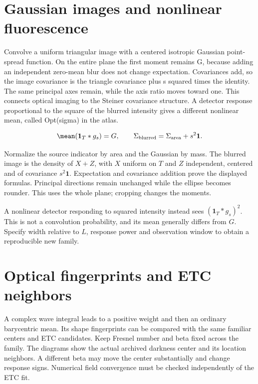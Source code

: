 \documentclass[11pt,oneside,openany]{book}
\begin{document}
\section{Gaussian images and nonlinear fluorescence}\label{sec:slide85}

Convolve a uniform triangular image with a centered isotropic Gaussian point-spread function. On the entire plane the first moment remains G, because adding an independent zero-mean blur does not change expectation. Covariances add, so the image covariance is the triangle covariance plus s squared times the identity. The same principal axes remain, while the axis ratio moves toward one. This connects optical imaging to the Steiner covariance structure. A detector response proportional to the square of the blurred intensity gives a different nonlinear mean, called Opt(sigma) in the atlas.


\[\mean(\mathbf1_T*g_s)=G,\qquad\Sigma_{\rm blurred}=\Sigma_{\rm area}+s^2\mathbf1.\]



Normalize the source indicator by area and the Gaussian by mass.
The blurred image is the density of $X+Z$, with $X$ uniform on $T$
and $Z$ independent, centered and of covariance $s^2\mathbf1$.
Expectation and covariance addition prove the displayed formulas.
Principal directions remain unchanged while the ellipse becomes
rounder. This uses the whole plane; cropping changes the moments.

A nonlinear detector responding to squared intensity instead sees
$(\mathbf1_T*g_s)^2$. This is not a convolution probability,
and its mean generally differs from $G$.
Specify width relative to $L$, response power and observation window
to obtain a reproducible new family.




\section{Optical fingerprints and ETC neighbors}\label{sec:slide86}

A complex wave integral leads to a positive weight and then an ordinary barycentric mean. Its shape fingerprints can be compared with the same familiar centers and ETC candidates. Keep Fresnel number and beta fixed across the family. The diagrams show the actual archived darkness center and its location neighbors. A different beta may move the center substantially and change response signs. Numerical field convergence must be checked independently of the ETC fit.
\end{document}
